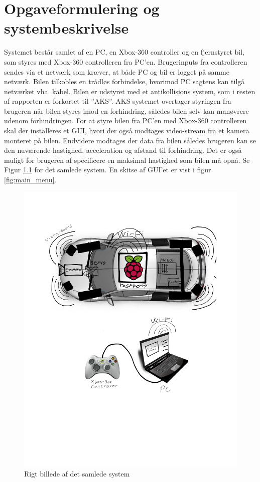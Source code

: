 \chapter{Opgaveformulering og systembeskrivelse} \label{ch:Systembeskrivelse} %



Systemet består samlet af en PC, en Xbox-360 controller og en fjernstyret bil, som styres med Xbox-360 controlleren fra PC'en. Brugerinputs fra controlleren sendes via et netværk som kræver, at både PC og bil er logget på samme netværk. Bilen tilkobles en trådløs forbindelse, hvorimod PC sagtens kan tilgå netværket vha. kabel. Bilen er udstyret med et antikollisions system, som i resten af rapporten er forkortet til ''AKS''. AKS systemet overtager styringen fra brugeren når bilen styres imod en forhindring, således bilen selv kan manøvrere udenom forhindringen. For at styre bilen fra PC'en med Xbox-360 controlleren skal der installeres et GUI, hvori der også modtages video-stream fra et kamera monteret på bilen. Endvidere modtages der data fra bilen således brugeren kan se den nuværende hastighed, acceleration og afstand til forhindring. Det er også muligt for brugeren af specificere en maksimal hastighed som bilen må opnå. Se Figur \ref{fig:rigbillede} for det samlede system. En skitse af GUI'et er vist i figur \ref{fig:main_menu}.
\begin{figure}[H]
\centering
\includegraphics[width=\textwidth - 7.38 cm]{../fig/billeder/rigbillede}
\caption{Rigt billede af det samlede system}
\label{fig:rigbillede}
\end{figure} 

